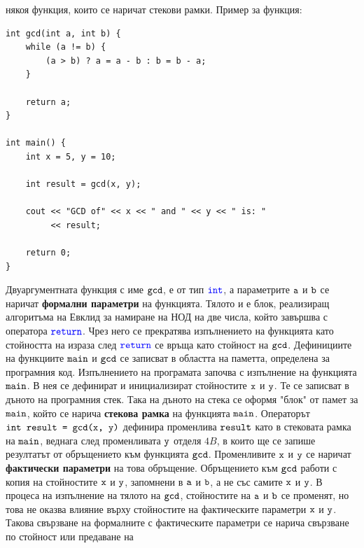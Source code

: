 \documentclass{article}
\begin{document}
някоя функция, които се наричат стекови рамки. \newline\newline
Пример за функция:
\begin{lstlisting}[style=cpp]
int gcd(int a, int b) {
    while (a != b) {
        (a > b) ? a = a - b : b = b - a; 
    }
    
    return a;
}

int main() {
    int x = 5, y = 10;

    int result = gcd(x, y);

    cout << "GCD of" << x << " and " << y << " is: "
         << result;

    return 0;
}
\end{lstlisting}
Двуаргументната функция с име $\textcolor{black}{\texttt{gcd}}$, е от тип $\textcolor{blue}{\texttt{int}}$, а параметрите $\textcolor{black}{\texttt{a}}$ и $\textcolor{black}{\texttt{b}}$ се наричат \textbf{формални параметри} на функцията.
Тялото и е блок, реализиращ алгоритъма на Евклид за намиране на НОД на две числа, който завършва с оператора $\textcolor{blue}{\texttt{return}}$. Чрез него се
прекратява изпълнението на функцията като стойността на израза след $\textcolor{blue}{\texttt{return}}$ се връща като стойност на $\textcolor{black}{\texttt{gcd}}$. \newline
Дефинициите на функциите $\textcolor{black}{\texttt{main}}$ и $\textcolor{black}{\texttt{gcd}}$ се записват в областта на паметта, определена за програмния код. Изпълнението на програмата
започва с изпълнение на функцията $\textcolor{black}{\texttt{main}}$. В нея се дефинират и инициализират стойностите $\textcolor{black}{\texttt{x}}$ и $\textcolor{black}{\texttt{y}}$. Те се записват в дъното на
програмния стек. Така на дъното на стека се оформя "блок" от памет за $\textcolor{black}{\texttt{main}}$, който се нарича \textbf{стекова рамка} на функцията $\textcolor{black}{\texttt{main}}$.
Операторът $\textcolor{black}{\texttt{int result = gcd(x, y)}}$ дефинира променлива $\textcolor{black}{\texttt{result}}$ като в стековата рамка на $\textcolor{black}{\texttt{main}}$, веднага след променливата $\textcolor{black}{\texttt{y}}$ отделя
$4B$, в които ще се запише резултатът от обръщението към функцията $\textcolor{black}{\texttt{gcd}}$. Променливите $\textcolor{black}{\texttt{x}}$ и $\textcolor{black}{\texttt{y}}$ се наричат \textbf{фактически параметри}
на това обръщение. Обръщението към $\textcolor{black}{\texttt{gcd}}$ работи с копия на стойностите $\textcolor{black}{\texttt{x}}$ и $\textcolor{black}{\texttt{y}}$, запомнени в $\textcolor{black}{\texttt{a}}$ и $\textcolor{black}{\texttt{b}}$, а не със самите $\textcolor{black}{\texttt{x}}$ и $\textcolor{black}{\texttt{y}}$.
В процеса на изпълнение на тялото на $\textcolor{black}{\texttt{gcd}}$, стойностите на $\textcolor{black}{\texttt{a}}$ и $\textcolor{black}{\texttt{b}}$ се променят, но това не оказва влияние върху стойностите на
фактическите параметри $\textcolor{black}{\texttt{x}}$ и $\textcolor{black}{\texttt{y}}$. Такова свързване на формалните с фактическите параметри се нарича свързване по стойност или предаване на
\end{document}
